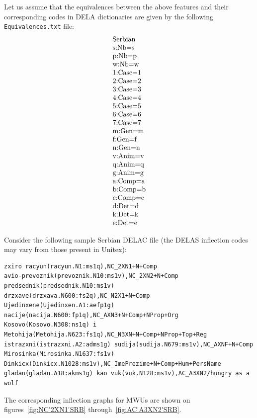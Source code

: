 \bigskip
\noindent Let us assume that the equivalences between the above features and
their corresponding codes in DELA dictionaries are given by the following 
\verb+Equivalences.txt+ file:
\[
\begin{array}[l]{l}
$Serbian$ \\
$s:Nb=s$ \\
$p:Nb=p$ \\
$w:Nb=w$ \\
$1:Case=1$ \\
$2:Case=2$ \\
$3:Case=3$ \\
$4:Case=4$ \\
$5:Case=5$ \\
$6:Case=6$ \\
$7:Case=7$ \\
$m:Gen=m$ \\
$f:Gen=f$ \\
$n:Gen=n$ \\
$v:Anim=v$ \\
$q:Anim=q$ \\
$g:Anim=g$ \\
$a:Comp=a$ \\
$b:Comp=b$ \\
$c:Comp=c$ \\
$d:Det=d$ \\
$k:Det=k$ \\
$e:Det=e$
\end{array}
\]

\bigskip
\noindent Consider the following sample Serbian DELAC file (the DELAS inflection codes may 
vary from those present in Unitex):

\scriptsize
\begin{verbatim}
zxiro racyun(racyun.N1:ms1q),NC_2XN1+N+Comp
avio-prevoznik(prevoznik.N10:ms1v),NC_2XN2+N+Comp
predsednik(predsednik.N10:ms1v) drzxave(drzxava.N600:fs2q),NC_N2X1+N+Comp
Ujedinxene(Ujedinxen.A1:aefp1g) nacije(nacija.N600:fp1q),NC_AXN3+N+Comp+NProp+Org
Kosovo(Kosovo.N308:ns1q) i Metohija(Metohija.N623:fs1q),NC_N3XN+N+Comp+NProp+Top+Reg 
istrazxni(istrazxni.A2:adms1g) sudija(sudija.N679:ms1v),NC_AXNF+N+Comp
Mirosinka(Mirosinka.N1637:fs1v) Dinkicx(Dinkicx.N1028:ms1v),NC_ImePrezime+N+Comp+Hum+PersName
gladan(gladan.A18:akms1g) kao vuk(vuk.N128:ms1v),AC_A3XN2/hungry as a wolf
\end{verbatim}
\normalsize

\bigskip
\noindent The corresponding inflection graphs for MWUs are shown on
figures~\ref{fig:NC'2XN1'SRB}  through~\ref{fig:AC'A3XN2'SRB}. 

